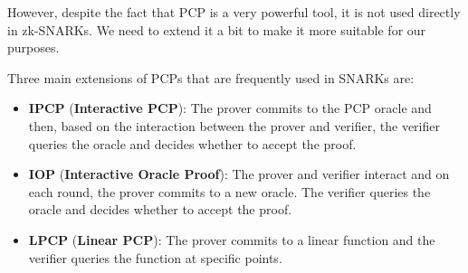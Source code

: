 \documentclass[../lecture-notes-148x210.tex]{subfiles}
\begin{document}
However, despite the fact that PCP is a very powerful tool, it is not used directly in zk-SNARKs. We need to extend it a bit to make it more suitable for our purposes.

Three main extensions of PCPs that are frequently used in SNARKs are:
\begin{itemize}
    \item \textbf{IPCP} (\textbf{Interactive PCP}): The prover commits to the PCP oracle and then, based on the interaction between the prover and verifier, the verifier queries the oracle and decides whether to accept the proof.
    \item \textbf{IOP} (\textbf{Interactive Oracle Proof}): The prover and verifier interact and on each round, the prover commits to a new oracle. The verifier queries the oracle and decides whether to accept the proof.
    \item \textbf{LPCP} (\textbf{Linear PCP}): The prover commits to a linear function and the verifier queries the function at specific points.
\end{itemize}
\end{document}
